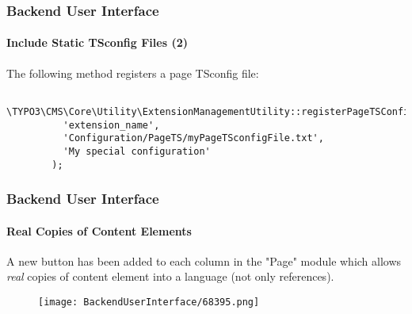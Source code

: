 \begin{frame}[fragile]
	\frametitle{Backend User Interface}
	\framesubtitle{Include Static TSconfig Files (2)}

	\lstset{basicstyle=\tiny\ttfamily}

	The following method registers a page TSconfig file:

	\begin{lstlisting}
		\TYPO3\CMS\Core\Utility\ExtensionManagementUtility::registerPageTSConfigFile(
		  'extension_name',
		  'Configuration/PageTS/myPageTSconfigFile.txt',
		  'My special configuration'
		);
	\end{lstlisting}

\end{frame}

\begin{frame}[fragile]
	\frametitle{Backend User Interface}
	\framesubtitle{Real Copies of Content Elements}

	A new button has been added to each column in the "Page" module which allows \textit{real} copies of content element
	into a language (not only references).

	\begin{figure}
		\texttt{[image: BackendUserInterface/68395.png]}
	\end{figure}

\end{frame}


